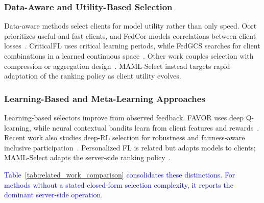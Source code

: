 \documentclass[journal]{IEEEtran}
\newcommand{\revision}[1]{\textcolor{blue}{#1}}
\begin{document}
\subsubsection{Data-Aware and Utility-Based Selection}
Data-aware methods select clients for model utility rather than only speed. Oort prioritizes useful and fast clients, and FedCor models correlations between client losses~\cite{lai2021oort,tang2022fedcor}. CriticalFL uses critical learning periods, while FedGCS searches for client combinations in a learned continuous space~\cite{yan2023criticalfl,ning2024fedgcs}. Other work couples selection with compression or aggregation design~\cite{xu2024federated,tran2026fedimp}. MAML-Select instead targets rapid adaptation of the ranking policy as client utility evolves.

\subsubsection{Learning-Based and Meta-Learning Approaches}
Learning-based selectors improve from observed feedback. FAVOR uses deep Q-learning, while neural contextual bandits learn from client features and rewards~\cite{wang2020optimizing,pan2024contextual}. Recent work also studies deep-RL selection for robustness and fairness-aware inclusive participation~\cite{kazemi2026robust,arisdakessian2026vox}. Personalized FL is related but adapts models to clients; MAML-Select adapts the server-side ranking policy~\cite{fallah2020personalized}.

\revision{Table~\ref{tab:related_work_comparison} consolidates these distinctions. For methods without a stated closed-form selection complexity, it reports the dominant server-side operation.}
\end{document}
